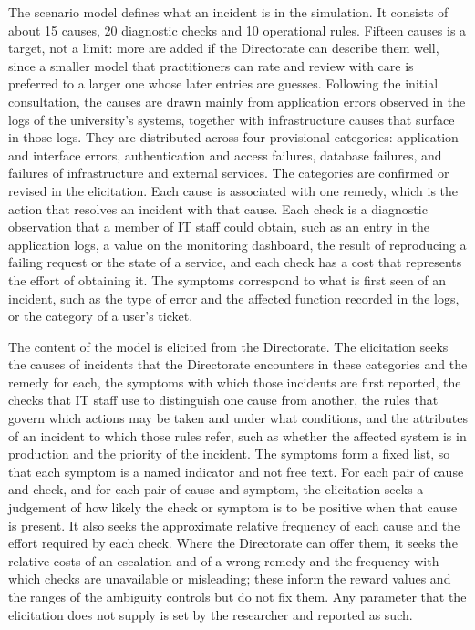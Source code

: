 The scenario model defines what an incident is in the simulation. It consists of about 15 causes, 20 diagnostic checks and 10 operational rules. Fifteen causes is a target, not a limit: more are added if the Directorate can describe them well, since a smaller model that practitioners can rate and review with care is preferred to a larger one whose later entries are guesses. Following the initial consultation, the causes are drawn mainly from application errors observed in the logs of the university's systems, together with infrastructure causes that surface in those logs. They are distributed across four provisional categories: application and interface errors, authentication and access failures, database failures, and failures of infrastructure and external services. The categories are confirmed or revised in the elicitation. Each cause is associated with one remedy, which is the action that resolves an incident with that cause. Each check is a diagnostic observation that a member of IT staff could obtain, such as an entry in the application logs, a value on the monitoring dashboard, the result of reproducing a failing request or the state of a service, and each check has a cost that represents the effort of obtaining it. The symptoms correspond to what is first seen of an incident, such as the type of error and the affected function recorded in the logs, or the category of a user's ticket.

The content of the model is elicited from the Directorate. The elicitation seeks the causes of incidents that the Directorate encounters in these categories and the remedy for each, the symptoms with which those incidents are first reported, the checks that IT staff use to distinguish one cause from another, the rules that govern which actions may be taken and under what conditions, and the attributes of an incident to which those rules refer, such as whether the affected system is in production and the priority of the incident. The symptoms form a fixed list, so that each symptom is a named indicator and not free text. For each pair of cause and check, and for each pair of cause and symptom, the elicitation seeks a judgement of how likely the check or symptom is to be positive when that cause is present. It also seeks the approximate relative frequency of each cause and the effort required by each check. Where the Directorate can offer them, it seeks the relative costs of an escalation and of a wrong remedy and the frequency with which checks are unavailable or misleading; these inform the reward values and the ranges of the ambiguity controls but do not fix them. Any parameter that the elicitation does not supply is set by the researcher and reported as such.

